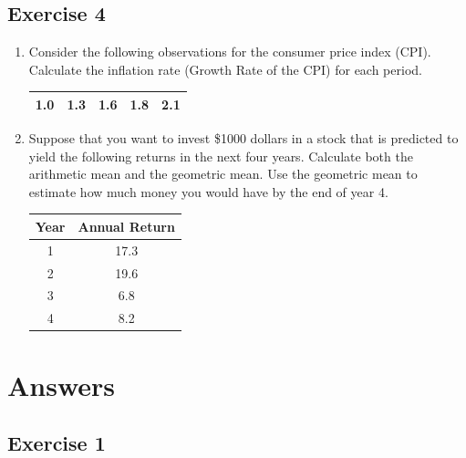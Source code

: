 \documentclass[
  letterpaper,
  DIV=11,
  numbers=noendperiod]{scrreprt}
\begin{document}
\hypertarget{exercise-4}{%
\subsection*{Exercise 4}\label{exercise-4}}

\begin{enumerate}
\def\labelenumi{\arabic{enumi}.}
\item
  Consider the following observations for the consumer price index
  (CPI). Calculate the inflation rate (Growth Rate of the CPI) for each
  period.

  \begin{longtable}[]{@{}ccccc@{}}
  \toprule()
  \endhead
  1.0 & 1.3 & 1.6 & 1.8 & 2.1 \\
  \bottomrule()
  \end{longtable}
\item
  Suppose that you want to invest \$1000 dollars in a stock that is
  predicted to yield the following returns in the next four years.
  Calculate both the arithmetic mean and the geometric mean. Use the
  geometric mean to estimate how much money you would have by the end of
  year 4.

  \begin{longtable}[]{@{}cc@{}}
  \toprule()
  Year & Annual Return \\
  \midrule()
  \endhead
  1 & 17.3 \\
  2 & 19.6 \\
  3 & 6.8 \\
  4 & 8.2 \\
  \bottomrule()
  \end{longtable}
\end{enumerate}

\hypertarget{answers-2}{%
\section{Answers}\label{answers-2}}

\hypertarget{exercise-1-5}{%
\subsection*{Exercise 1}\label{exercise-1-5}}
\end{document}
